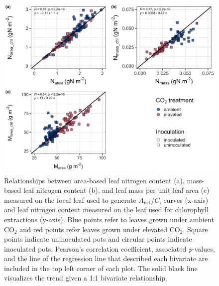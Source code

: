 \newpage
\begin{figure}
    \centering
    \includegraphics[width=\linewidth]{ch5_NxCO2xI/figs/NxCO2xI_figS1_leafN_chl.jpg}
    \caption[Relationships between area-based leaf nitrogen content, mass-based leaf nitrogen content, and leaf mass per unit leaf area measured on the focal leaf used to generate $A_\mathrm{net}$/$C_\mathrm{i}$ curves and leaf nitrogen content measured on the leaf used for chlorophyll extractions]{Relationships between area-based leaf nitrogen content (a), mass-based leaf nitrogen content (b), and leaf mass per unit leaf area (c) measured on the focal leaf used to generate $A_\mathrm{net}$/$C_\mathrm{i}$ curves (x-axis) and leaf nitrogen content measured on the leaf used for chlorophyll extractions (y-axis). Blue points refer to leaves grown under ambient CO$_2$ and red points refer leaves grown under elevated CO$_2$. Square points indicate uninoculated pots and circular points indicate inoculated pots. Pearson's correlation coefficient, associated \textit{p}-values, and the line of the regression line that described each bivariate are included in the top left corner of each plot. The solid black line visualizes the trend given a 1:1 bivariate relationship.}
    \label{fig:figure.d1}
\end{figure}
\clearpage

